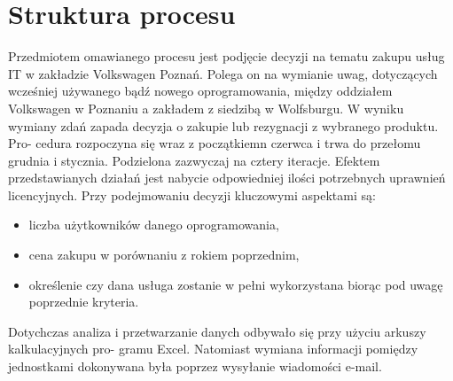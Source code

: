 \section{Struktura procesu}
Przedmiotem omawianego procesu jest podjęcie decyzji na tematu zakupu usług IT w zakładzie
Volkswagen Poznań. Polega on na wymianie uwag, dotyczących wcześniej używanego bądź nowego
oprogramowania, między oddziałem Volkswagen w Poznaniu a zakładem z siedzibą w Wolfsburgu.
W wyniku wymiany zdań zapada decyzja o zakupie lub rezygnacji z wybranego produktu. Pro-
cedura rozpoczyna się wraz z początkiemn czerwca i trwa do przełomu grudnia i stycznia. Podzielona zazwyczaj na cztery iteracje. Efektem
przedstawianych działań jest nabycie odpowiedniej ilości potrzebnych uprawnień licencyjnych. Przy
podejmowaniu decyzji kluczowymi aspektami są:
\begin{itemize}
    \item liczba użytkowników danego oprogramowania,
    \item cena zakupu w porównaniu z rokiem poprzednim,
    \item określenie czy dana usługa zostanie w pełni wykorzystana biorąc pod uwagę poprzednie
kryteria.
\end{itemize}
Dotychczas analiza i przetwarzanie danych odbywało się przy użyciu arkuszy kalkulacyjnych pro-
gramu Excel. Natomiast wymiana informacji pomiędzy jednostkami dokonywana była poprzez
wysyłanie wiadomości e-mail.